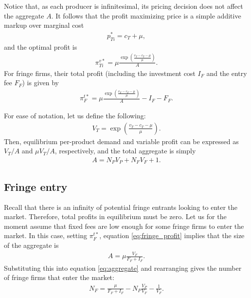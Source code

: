 \documentclass[a4paper]{article}
\begin{document}
Notice that, as each producer is infinitesimal, its pricing decision does not affect the aggregate $A$.
It follows that the profit maximizing price is a simple additive markup over marginal cost
\begin{align*}
    p^*_{Ti} = c_T + \mu,
\end{align*}
and the optimal profit is
\begin{align}
    \pi^{v*}_{Ti} = \mu \frac{\exp \left( \frac{v_T - c_T - \mu}{\mu} \right)}{A}.
    \label{eq:optimal_profit}
\end{align}
For fringe firms, their total profit (including the investment cost $I_F$ and the entry fee $F_F$) is given by
\begin{align}
    \pi^{t*}_F = \mu \frac{\exp \left( \frac{v_F - c_F - \mu}{\mu} \right)}{A} - I_F - F_F.
    \label{eq:fringe_profit}
\end{align}

For ease of notation, let us define the following:
\begin{align*}
    V_T = \exp \left( \frac{v_T - c_T - \mu}{\mu} \right).
\end{align*}
Then, equilibrium per-product demand and variable profit can be expressed as $V_T/ A$ and $\mu V_T/ A$, respectively, and the total aggregate is simply
\begin{align*}
    A = N_P V_P + N_F V_F + 1.
\end{align*}

\subsection{Fringe entry}

Recall that there is an infinity of potential fringe entrants looking to enter the market.
Therefore, total profits in equilibrium must be zero.
Let us for the moment assume that fixed fees are low enough for some fringe firms to enter the market.
In this case, setting $\pi^{t*}_F$, equation \eqref{eq:fringe_profit} implies that the size of the aggregate is
\begin{align}
    A = \mu \frac{V_F}{F_F + I_F}.
    \label{eq:aggregate_eq}
\end{align}
Substituting this into equation \eqref{eq:aggregate} and rearranging gives the number of fringe firms that enter the market:
\begin{align*}
    N_F = \frac{\mu}{F_F + I_F} - N_P \frac{V_P}{V_F} - \frac{1}{V_F}.
\end{align*}
\end{document}
